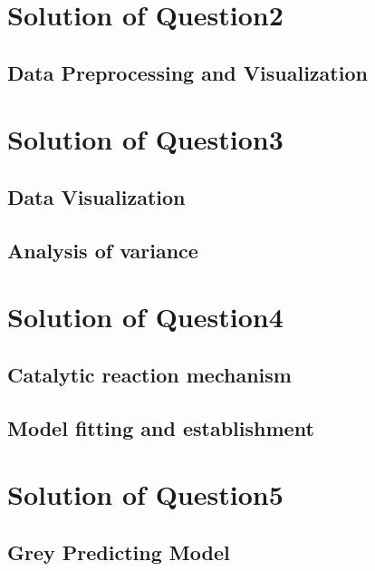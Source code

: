 \documentclass{swmcmthesis}
\begin{document}
\section{Solution of Question2}

\subsection*{Data Preprocessing and Visualization}

\section{Solution of Question3}


\subsection{Data Visualization}

\subsection{Analysis of variance}




\section{Solution of Question4}
\subsection{Catalytic reaction mechanism}

\subsection{Model fitting and establishment}







\clearpage
\newpage

\section{Solution of Question5}
\paragraph*{}


\subsection*{Grey Predicting Model}
\end{document}
